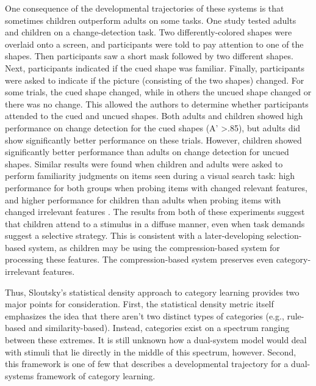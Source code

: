 \documentclass[../dissertation.tex]{subfiles}
\begin{document}
	One consequence of the developmental trajectories of these systems is that sometimes children outperform adults on some tasks. One study tested adults and children on a change-detection task. Two differently-colored shapes were overlaid onto a screen, and participants were told to pay attention to one of the shapes. Then participants saw a short mask followed by two different shapes. Next, participants indicated if the cued shape was familiar. Finally, participants were asked to indicate if the picture (consisting of the two shapes) changed. For some trials, the cued shape changed, while in others the uncued shape changed or there was no change. This allowed the authors to determine whether participants attended to the cued and uncued shapes. Both adults and children showed high performance on change detection for the cued shapes (A' \textgreater .85), but adults did show significantly better performance on these trials. However, children showed significantly better performance than adults on change detection for uncued shapes. Similar results were found when children and adults were asked to perform familiarity judgments on items seen during a visual search task: high performance for both groups when probing items with changed relevant features, and higher performance for children than adults when probing items with changed irrelevant features \citep{Plebanek2017}. The results from both of these experiments suggest that children attend to a stimulus in a diffuse manner, even when task demands suggest a selective strategy. This is consistent with a later-developing selection-based system, as children may be using the compression-based system for processing these features. The compression-based system preserves even category-irrelevant features. \par
	Thus, Sloutsky's statistical density approach to category learning provides two major points for consideration. First, the statistical density metric itself emphasizes the idea that there aren't two distinct types of categories (e.g., rule-based and similarity-based). Instead, categories exist on a spectrum ranging between these extremes. It is still unknown how a dual-system model would deal with stimuli that lie directly in the middle of this spectrum, however. Second, this framework is one of few that describes a developmental trajectory for a dual-systems framework of category learning.
\end{document}
